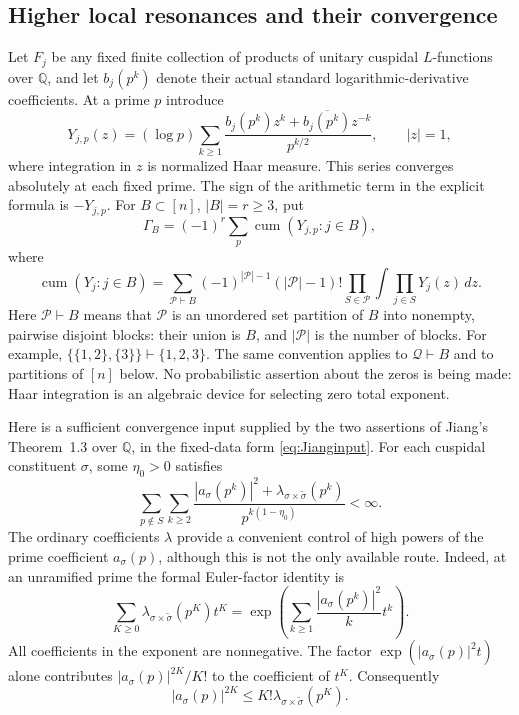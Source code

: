 \documentclass[11pt]{article}
\numberwithin{equation}{section}
\theoremstyle{remark}
\begin{document}
\subsection{Higher local resonances and their convergence}
Let $F_j$ be any fixed finite collection of products of unitary cuspidal
$L$-functions over $\mathbb Q$, and let $b_j(p^k)$ denote their actual
standard logarithmic-derivative coefficients.  At a prime $p$ introduce
\[
 Y_{j,p}(z)=(\log p)\sum_{k\ge1}
 \frac{b_j(p^k)z^k+\overline{b_j(p^k)}z^{-k}}{p^{k/2}},
 \qquad |z|=1,
\]
where integration in $z$ is normalized Haar measure.  This series converges
absolutely at each fixed prime.  The sign of the arithmetic term in the
explicit formula is $-Y_{j,p}$.
For $B\subset[n]$, $|B|=r\ge3$, put
\[
 \Gamma_B=(-1)^r\sum_p\operatorname{cum}(Y_{j,p}:j\in B),
\]
where
\[
 \operatorname{cum}(Y_j:j\in B)=
 \sum_{\mathcal P\vdash B}(-1)^{|\mathcal P|-1}(|\mathcal P|-1)!
 \prod_{S\in\mathcal P}\int\prod_{j\in S}Y_j(z)\,dz.
\]
Here $\mathcal P\vdash B$ means that $\mathcal P$ is an unordered
set partition of $B$ into nonempty, pairwise disjoint blocks: their
union is $B$, and $|\mathcal P|$ is the number of blocks. For example,
$\{\{1,2\},\{3\}\}\vdash\{1,2,3\}$.
The same convention applies to $\mathcal Q\vdash B$ and to
partitions of $[n]$ below. No probabilistic assertion about the zeros
is being made: Haar integration is an algebraic device for selecting
zero total exponent.

Here is a sufficient convergence input supplied by the two assertions of
Jiang's Theorem~1.3 over $\mathbb Q$, in the fixed-data form \eqref{eq:Jianginput}.  For each
cuspidal constituent $\sigma$, some $\eta_0>0$ satisfies
\[
 \sum_{p\notin S}\sum_{k\ge2}
 \frac{|a_\sigma(p^k)|^2+\lambda_{\sigma\times\widetilde\sigma}(p^k)}
 {p^{k(1-\eta_0)}}<\infty. \tag{J+}
\]
The ordinary coefficients $\lambda$ provide a convenient control of high
powers of the prime coefficient $a_\sigma(p)$, although this is not the
only available route.
Indeed, at an unramified prime the formal Euler-factor identity is
\[
 \sum_{K\ge0}\lambda_{\sigma\times\widetilde\sigma}(p^K)t^K
 =\exp\left(\sum_{k\ge1}\frac{|a_\sigma(p^k)|^2}{k}t^k\right).
\]
All coefficients in the exponent are nonnegative.  The factor
$\exp(|a_\sigma(p)|^2t)$ alone contributes
$|a_\sigma(p)|^{2K}/K!$ to the coefficient of $t^K$.  Consequently
\[
 |a_\sigma(p)|^{2K}\le K!\lambda_{\sigma\times\widetilde\sigma}(p^K).
 \tag{H1K}
\]
\end{document}
